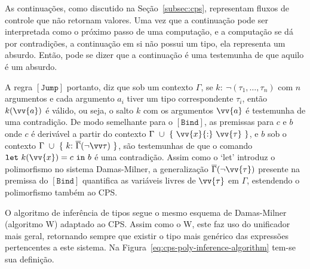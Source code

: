 As continuações, como discutido na Seção~\ref{subsec:cps}, representam fluxos de controle que não retornam valores.
Uma vez que a continuação pode ser interpretada como o próximo passo de uma computação, e a computação se dá por contradições, a continuação em si não possui um tipo, ela representa um absurdo.
Então, pode se dizer que a continuação é uma testemunha de que aquilo é um absurdo.

A regra $[\mathtt{Jump}]$ portanto, diz que sob um contexto $\Gamma$, se $k{:}\ \neg(\tau_1,\dots,\tau_n)$ com $n$ argumentos e cada argumento $a_i$ tiver um tipo correspondente $\tau_i$, então $k(\vv{a})$ é válido, ou seja, o salto $k$ com os argumentos $\vv{a}$ é testemunha de uma contradição.
De modo semelhante para o $\mathtt{[Bind]}$, as premissas para $c$ e $b$ onde $c$ é derivável a partir do contexto $\Gamma\ \cup\ \{\ \vv{x}{:}\ \vv{\tau}\ \}$, e $b$ sob o contexto $\Gamma\ \cup\ \{\ k{:}\ \overline{\Gamma}(\neg\vv\tau)\ \}$, são testemunhas de que o comando $\mathtt{let}\ k(\vv{x}) = c\ \mathtt{in}\ b$ é uma contradição.
Assim como o `let' introduz o polimorfismo no sistema Damas-Milner, a generalização $\overline{\Gamma}(\neg\vv{\tau})$ presente na premissa do $\mathtt{[Bind]}$ quantifica as variáveis livres de $\vv{\tau}$ em $\Gamma$, estendendo o polimorfismo também ao CPS.

O algoritmo de inferência de tipos segue o mesmo esquema de Damas-Milner (algoritmo W) adaptado ao CPS.
Assim como o W, este faz uso do unificador mais geral, retornando sempre que existir o tipo mais genérico das expressões pertencentes a este sistema.
Na Figura~\ref{eq:cps-poly-inference-algorithm} tem-se sua definição.

